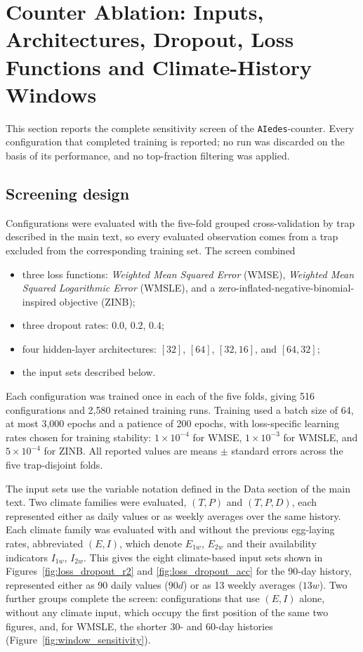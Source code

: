 \documentclass[11pt,a4paper]{article}
\begin{document}
\section{Counter Ablation: Inputs, Architectures, Dropout, Loss Functions and Climate-History Windows}

This section reports the complete sensitivity screen of the \texttt{AIedes}-counter. Every configuration that completed training is reported; no run was discarded on the basis of its performance, and no top-fraction filtering was applied.

\subsection{Screening design}

Configurations were evaluated with the five-fold grouped cross-validation by trap described in the main text, so every evaluated observation comes from a trap excluded from the corresponding training set. The screen combined
\begin{itemize}
    \item three loss functions: \textit{Weighted Mean Squared Error} (WMSE), \textit{Weighted Mean Squared Logarithmic Error} (WMSLE), and a zero-inflated-negative-binomial-inspired objective (ZINB);
    \item three dropout rates: $0.0$, $0.2$, $0.4$;
    \item four hidden-layer architectures: $[32]$, $[64]$, $[32,16]$, and $[64,32]$;
    \item the input sets described below.
\end{itemize}
Each configuration was trained once in each of the five folds, giving 516 configurations and 2,580 retained training runs. Training used a batch size of 64, at most 3,000 epochs and a patience of 200 epochs, with loss-specific learning rates chosen for training stability: $1\times10^{-4}$ for WMSE, $1\times10^{-3}$ for WMSLE, and $5\times10^{-4}$ for ZINB. All reported values are means $\pm$ standard errors across the five trap-disjoint folds.

The input sets use the variable notation defined in the Data section of the main text. Two climate families were evaluated, $(T,P)$ and $(T,P,D)$, each represented either as daily values or as weekly averages over the same history. Each climate family was evaluated with and without the previous egg-laying rates, abbreviated $(E,I)$, which denote $E_{1w}$, $E_{2w}$ and their availability indicators $I_{1w}$, $I_{2w}$. This gives the eight climate-based input sets shown in Figures~\ref{fig:loss_dropout_r2} and \ref{fig:loss_dropout_acc} for the 90-day history, represented either as 90 daily values ($90d$) or as 13 weekly averages ($13w$). Two further groups complete the screen: configurations that use $(E,I)$ alone, without any climate input, which occupy the first position of the same two figures, and, for WMSLE, the shorter 30- and 60-day histories (Figure~\ref{fig:window_sensitivity}).
\end{document}
